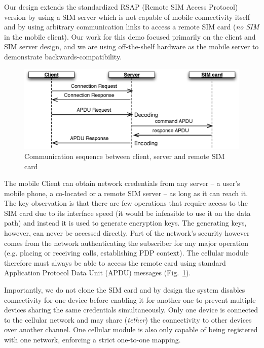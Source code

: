 \documentclass{sig-alternate-10pt}
\begin{document}
Our design extends the standardized RSAP (Remote SIM Access Protocol) version by using a SIM server which is not capable of mobile connectivity itself and by using arbitrary communication links to access a remote SIM card (\emph{no SIM} in the mobile client). Our work for this demo focused primarily on the client and SIM server design, and we are using off-the-shelf hardware as the mobile server to demonstrate backwards-compatibility.

\begin{figure}[t!]
\centering
\includegraphics[width=0.9\columnwidth]{figs/sequence}
\caption{Communication sequence between client, server and remote SIM card}
\label{fig:sequence}
\end{figure}

The mobile Client can obtain network credentials from any server -- a user's mobile phone, a co-located or a remote SIM server -- as long as it can reach it. The key observation is that there are few operations that require access to the SIM card due to its interface speed (it would be infeasible to use it on the data path) and instead it is used to generate encryption keys. The generating keys, however, can never be accessed directly. Part of the network's security however comes from the network authenticating the subscriber for any major operation (e.g. placing or receiving calls, establishing PDP context). The cellular module therefore must always be able to access the remote card using standard Application Protocol Data Unit (APDU) messages (Fig.~\ref{fig:sequence}).

Importantly, we do not clone the SIM card and by design the system disables connectivity for one device before enabling it for another one to prevent multiple devices sharing the same credentials simultaneously. Only one device is connected to the cellular network and may share (\emph{tether}) the connectivity to other devices over another channel. One cellular module is also only capable of being registered with one network, enforcing a strict one-to-one mapping.
\end{document}
